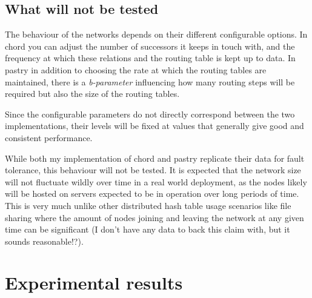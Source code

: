\subsection{What will not be tested}
The behaviour of the networks depends on their different configurable options. 
In chord you can adjust the number of successors it keeps in touch with, and the frequency at which these relations and the routing table is kept up to data.
In pastry in addition to choosing the rate at which the routing tables are maintained, there is a \textit{b-parameter} influencing how many routing steps will be required but also the size of the routing tables.

Since the configurable parameters do not directly correspond between the two implementations, their levels will be fixed at values that generally give good and consistent performance.

While both my implementation of chord and pastry replicate their data for fault tolerance, this behaviour will not be tested. It is expected that the network size will not fluctuate wildly over time in a real world deployment, as the nodes likely will be hosted on servers expected to be in operation over long periods of time. This is very much unlike other distributed hash table usage scenarios like file sharing where the amount of nodes joining and leaving the network at any given time can be significant (I don't have any data to back this claim with, but it sounds reasonable!?).


\section{Experimental results}

